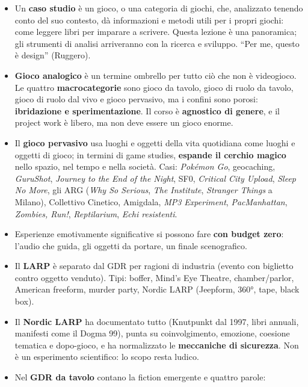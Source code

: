 \begin{itemize}
  \item Un \textbf{caso studio} è un gioco, o una categoria di giochi, che,
        analizzato tenendo conto del suo contesto, dà informazioni e metodi
        utili per i propri giochi: come leggere libri per imparare a scrivere.
        Questa lezione è una panoramica; gli strumenti di analisi arriveranno con
        la ricerca e sviluppo. ``Per me, questo è design'' (Ruggero).
  \item \textbf{Gioco analogico} è un termine ombrello per tutto ciò che non è
        videogioco. Le quattro \textbf{macrocategorie} sono gioco da tavolo,
        gioco di ruolo da tavolo, gioco di ruolo dal vivo e gioco pervasivo, ma
        i confini sono porosi: \textbf{ibridazione e sperimentazione}. Il corso è
        \textbf{agnostico di genere}, e il project work è libero, ma non deve
        essere un gioco enorme.
  \item Il \textbf{gioco pervasivo} usa luoghi e oggetti della vita quotidiana
        come luoghi e oggetti di gioco; in termini di game studies,
        \textbf{espande il cerchio magico} nello spazio, nel tempo e nella
        società. Casi: \emph{Pokémon Go}, geocaching, \emph{GuruShot},
        \emph{Journey to the End of the Night}, SF0, \emph{Critical City Upload},
        \emph{Sleep No More}, gli ARG (\emph{Why So Serious}, \emph{The
        Institute}, \emph{Stranger Things} a Milano), Collettivo Cinetico,
        Amigdala, \emph{MP3 Experiment}, \emph{PacManhattan}, \emph{Zombies,
        Run!}, \emph{Reptilarium}, \emph{Echi resistenti}.
  \item Esperienze emotivamente significative si possono fare \textbf{con budget
        zero}: l'audio che guida, gli oggetti da portare, un finale
        scenografico.
  \item Il \textbf{LARP} è separato dal GDR per ragioni di industria (evento con
        biglietto contro oggetto venduto). Tipi: boffer, Mind's Eye Theatre,
        chamber/parlor, American freeform, murder party, Nordic LARP (Jeepform,
        360°, tape, black box).
  \item Il \textbf{Nordic LARP} ha documentato tutto (Knutpunkt dal 1997, libri
        annuali, manifesti come il Dogma 99), punta su coinvolgimento, emozione,
        coesione tematica e dopo-gioco, e ha normalizzato le \textbf{meccaniche di
        sicurezza}. Non è un esperimento scientifico: lo scopo resta ludico.
  \item Nel \textbf{GDR da tavolo} contano la fiction emergente e quattro parole:

\end{itemize}
